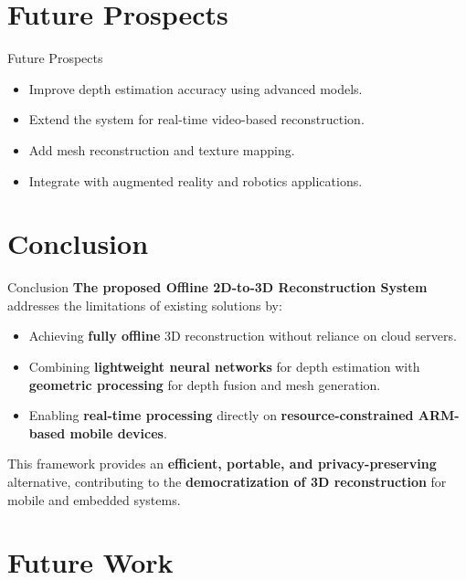 \documentclass[11pt]{beamer}
\begin{document}
\section{Future Prospects}

\begin{frame}{Future Prospects}
\begin{itemize}
\item Improve depth estimation accuracy using advanced models.
\item Extend the system for real-time video-based reconstruction.
\item Add mesh reconstruction and texture mapping.
\item Integrate with augmented reality and robotics applications.
\end{itemize}
\end{frame}

\section{Conclusion}

\begin{frame}{Conclusion}
\textbf{The proposed Offline 2D-to-3D Reconstruction System} addresses the limitations of existing solutions by:

\begin{itemize}
    \item Achieving \textbf{fully offline} 3D reconstruction without reliance on cloud servers.
    \item Combining \textbf{lightweight neural networks} for depth estimation with \textbf{geometric processing} for depth fusion and mesh generation.
    \item Enabling \textbf{real-time processing} directly on \textbf{resource-constrained ARM-based mobile devices}.
\end{itemize}

\medskip
This framework provides an \textbf{efficient, portable, and privacy-preserving} alternative, contributing to the \textbf{democratization of 3D reconstruction} for mobile and embedded systems.
\end{frame}

\section{Future Work}
\end{document}
